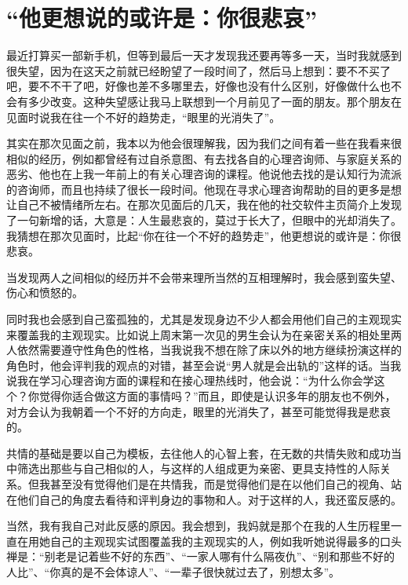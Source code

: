 \chapter{“他更想说的或许是：你很悲哀”}





最近打算买一部新手机，但等到最后一天才发现我还要再等多一天，当时我就感到很失望，因为在这天之前就已经盼望了一段时间了，然后马上想到：要不不买了吧，要不不干了吧，好像也差不多哪里去，好像也没有什么区别，好像做什么也不会有多少改变。这种失望感让我马上联想到一个月前见了一面的朋友。那个朋友在见面时说我在往一个不好的趋势走，“眼里的光消失了”。


其实在那次见面之前，我本以为他会很理解我，因为我们之间有着一些在我看来很相似的经历，例如都曾经有过自杀意图、有去找各自的心理咨询师、与家庭关系的恶劣、他也在上我一年前上的有关心理咨询的课程。他说他去找的是认知行为流派的咨询师，而且也持续了很长一段时间。他现在寻求心理咨询帮助的目的更多是想让自己不被情绪所左右。在那次见面后的几天，我在他的社交软件主页简介上发现了一句新增的话，大意是：人生最悲哀的，莫过于长大了，但眼中的光却消失了。我猜想在那次见面时，比起“你在往一个不好的趋势走”，他更想说的或许是：你很悲哀。

当发现两人之间相似的经历并不会带来理所当然的互相理解时，我会感到蛮失望、伤心和愤怒的。

同时我也会感到自己蛮孤独的，尤其是发现身边不少人都会用他们自己的主观现实来覆盖我的主观现实。比如说上周末第一次见的男生会认为在亲密关系的相处里两人依然需要遵守性角色的性格，当我说我不想在除了床以外的地方继续扮演这样的角色时，他会评判我的观点的对错，甚至会说“男人就是会出轨的”这样的话。当我说我在学习心理咨询方面的课程和在接心理热线时，他会说：“为什么你会学这个？你觉得你适合做这方面的事情吗？”而且，即使是认识多年的朋友也不例外，对方会认为我朝着一个不好的方向走，眼里的光消失了，甚至可能觉得我是悲哀的。

共情的基础是要以自己为模板，去往他人的心智上套，在无数的共情失败和成功当中筛选出那些与自己相似的人，与这样的人组成更为亲密、更具支持性的人际关系。但我甚至没有觉得他们是在共情我，而是觉得他们是在以他们自己的视角、站在他们自己的角度去看待和评判身边的事物和人。对于这样的人，我还蛮反感的。

当然，我有我自己对此反感的原因。我会想到，我妈就是那个在我的人生历程里一直在用她自己的主观现实试图覆盖我的主观现实的人，例如我听她说得最多的口头禅是：“别老是记着些不好的东西”、“一家人哪有什么隔夜仇”、“别和那些不好的人比”、“你真的是不会体谅人”、“一辈子很快就过去了，别想太多”。


